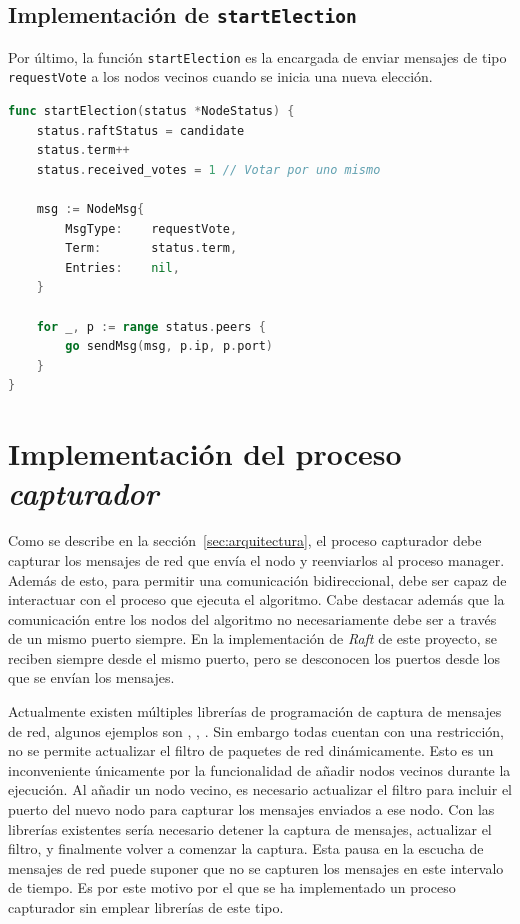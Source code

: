 \subsection{Implementación de \texttt{startElection}}

Por último, la función \texttt{startElection} es la encargada de enviar mensajes de tipo \texttt{requestVote} a los nodos vecinos cuando se inicia una nueva elección. 

\begin{lstlisting}[language=go]
func startElection(status *NodeStatus) {
	status.raftStatus = candidate
	status.term++
	status.received_votes = 1 // Votar por uno mismo

	msg := NodeMsg{
		MsgType:    requestVote,
		Term:       status.term,
		Entries:    nil,
	}

	for _, p := range status.peers {
		go sendMsg(msg, p.ip, p.port)
	}
}
\end{lstlisting}

\section{Implementación del proceso \textit{capturador}}

Como se describe en la sección~\ref{sec:arquitectura}, el proceso capturador debe capturar los mensajes de red que envía el nodo y reenviarlos al proceso manager. Además de esto, para permitir una comunicación bidireccional, debe ser capaz de interactuar con el proceso que ejecuta el algoritmo. Cabe destacar además que la comunicación entre los nodos del algoritmo no necesariamente debe ser a través de un mismo puerto siempre. En la implementación de \textit{Raft} de este proyecto, se reciben siempre desde el mismo puerto, pero se desconocen los puertos desde los que se envían los mensajes.

Actualmente existen múltiples librerías de programación de captura de mensajes de red, algunos ejemplos son \cite{libcap}, \cite{pyshark}, \cite{pypcap}. Sin embargo todas cuentan con una restricción, no se permite actualizar el filtro de paquetes de red dinámicamente. Esto es un inconveniente únicamente por la funcionalidad de añadir nodos vecinos durante la ejecución. Al añadir un nodo vecino, es necesario actualizar el filtro para incluir el puerto del nuevo nodo para capturar los mensajes enviados a ese nodo. Con las librerías existentes sería necesario detener la captura de mensajes, actualizar el filtro, y finalmente volver a comenzar la captura. Esta pausa en la escucha de mensajes de red puede suponer que no se capturen los mensajes en este intervalo de tiempo. Es por este motivo por el que se ha implementado un proceso capturador sin emplear librerías de este tipo.


